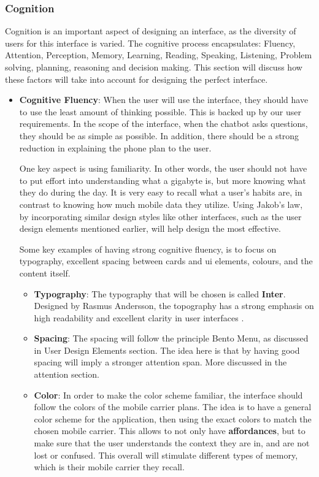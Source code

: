 \documentclass[conference]{IEEEtran}
\begin{document}
\subsubsection{Cognition}
Cognition is an important aspect of designing an interface, as the diversity of users for this interface is varied. The cognitive process encapsulates: Fluency, Attention, Perception, Memory, Learning, Reading, Speaking, Listening, Problem solving, planning, reasoning and decision making. This section will discuss how these factors will take into account for designing the perfect interface.
\begin{itemize}
    \item \textbf{Cognitive Fluency}: When the user will use the interface, they should have to use the least amount of thinking possible. This is backed up by our user requirements. In the scope of the interface, when the chatbot asks questions, they should be as simple as possible. In addition, there should be a strong reduction in explaining the phone plan to the user. 
    
    One key aspect is using familiarity. In other words, the user should not have to put effort into understanding what a gigabyte is, but more knowing what they do during the day. It is very easy to recall what a user's habits are, in contrast to knowing how much mobile data they utilize. Using Jakob's law, by incorporating similar design styles like other interfaces, such as the user design elements mentioned earlier, will help design the most effective. 
    
    Some key examples of having strong cognitive fluency, is to focus on typography, excellent spacing between cards and ui elements, colours, and the content itself.
    \begin{itemize}
        \item \textbf{Typography}: The typography that will be chosen is called \textbf{Inter}. Designed by Rasmus Andersson, the topography has a strong emphasis on high readability and excellent clarity in user interfaces \cite{interDesign}.
        \item \textbf{Spacing}: The spacing will follow the principle Bento Menu, as discussed in User Design Elements section. The idea here is that by having good spacing will imply a stronger attention span\cite{Tullis1987}. More discussed in the attention section.
        \item \textbf{Color}: In order to make the color scheme familiar, the interface should follow the colors of the mobile carrier plans. The idea is to have a general color scheme for the application, then using the exact colors to match the chosen mobile carrier. This allows to not only have \textbf{affordances}, but to make sure that the user understands the context they are in, and are not lost or confused. This overall will stimulate different types of memory, which is their mobile carrier they recall.
        

\end{itemize}
\end{itemize}
\end{document}
